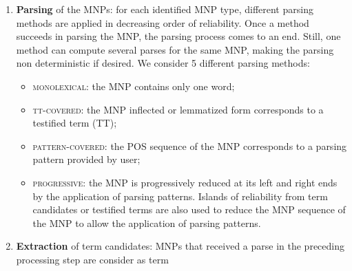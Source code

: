 \begin{enumerate}
The \emph{chunking frontiers} are tags or words that are not allowed to
  appear in MNPs, e.g. verbs (VBG) or prepositions (IN)\footnote{The Penn TreeBank
  tagset was used for the experiments}. \emph{Chunking exceptions} are
used to refine frontiers. For instance, \textit{"of"} is a
  frontier exception to prepositions,  \textit{"many"} and
  \textit{"several"} exceptions to adjectives. \emph{Forbidden
    structures} %
  are 
  exceptions for more complex structures and are used to prevent from
  extracting sequences that look like terms (syntactically valid) but
  are known not to be terms or parts of terms like \textit{"of course"}.
  MNPs and subparts of MNPs corresponding to testified terms (when available) are
  protected and cannot be modified using the chunking data. For
  instance, the tag FW is \textit{a priori} not allowed in MNPs. However, if a
  MNP is equal to or contains the testified term \textit{"in/IN vitro/FW"}, it will be kept as such.
\item \textbf{Parsing} of the MNPs: for each identified MNP type,
  different parsing methods are applied in decreasing order of
  reliability. Once a method succeeds in parsing the MNP, the parsing
  process comes to an end. Still, one method can compute several
  parses for the same MNP, making the parsing non deterministic if desired. 
  We consider 5 different parsing methods:
  \begin{itemize}
  \item \textsc{monolexical}: the MNP contains only one word;
  \item \textsc{tt-covered}: the MNP inflected or lemmatized form
    corresponds to a testified term (TT);
  \item \textsc{pattern-covered}: the POS sequence of the MNP corresponds to a
    parsing pattern provided by user;
  \item \textsc{progressive}: the MNP is progressively reduced at its left and
    right ends by the application of parsing patterns. Islands of
    reliability from term candidates or testified terms are also used to reduce the MNP sequence of the MNP to allow the application of parsing patterns.
  \end{itemize}
\item \textbf{Extraction} of term candidates: MNPs that received a
  parse in the preceding processing step are consider as term

\end{enumerate}
